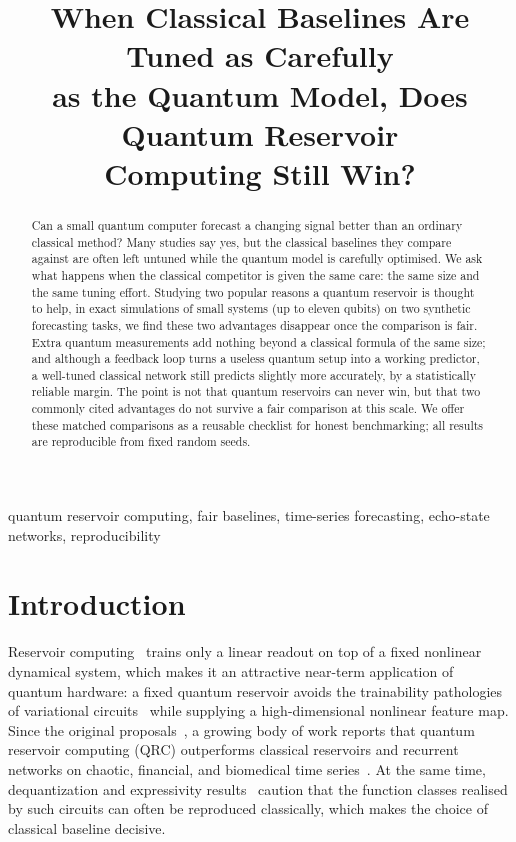 ﻿\documentclass[10pt,conference]{IEEEtran}
\begin{document}
\title{When Classical Baselines Are Tuned as Carefully\\
as the Quantum Model, Does Quantum Reservoir\\
Computing Still Win?}

\author{
}

\maketitle

\begin{abstract}
Can a small quantum computer forecast a changing signal better than an ordinary
classical method? Many studies say yes, but the classical baselines they compare
against are often left untuned while the quantum model is carefully optimised. We
ask what happens when the classical competitor is given the same care: the same
size and the same tuning effort. Studying two popular reasons a quantum reservoir
is thought to help, in exact simulations of small systems (up to eleven qubits)
on two synthetic forecasting tasks, we find these two advantages disappear once
the comparison is fair. Extra quantum
measurements add nothing beyond a classical formula of the same size; and although
a feedback loop turns a useless quantum setup into a working predictor, a
well-tuned classical network still predicts slightly more accurately, by a
statistically reliable margin. The point is not that quantum reservoirs can never
win, but that two commonly cited advantages do not survive a fair comparison at
this scale. We offer these matched comparisons as a reusable checklist for honest
benchmarking; all results are reproducible from fixed random seeds.
\end{abstract}

\begin{IEEEkeywords}
quantum reservoir computing, fair baselines, time-series forecasting, echo-state
networks, reproducibility
\end{IEEEkeywords}

\section{Introduction}

Reservoir computing~\cite{jaeger2001,maass2002} trains only a linear readout on
top of a fixed nonlinear dynamical system, which makes it an attractive
near-term application of quantum hardware: a fixed quantum reservoir avoids the
trainability pathologies of variational circuits~\cite{mcclean2018} while
supplying a high-dimensional nonlinear feature map. Since the original
proposals~\cite{fujii2017,nakajima2019}, a growing body of work reports that
quantum reservoir computing (QRC) outperforms classical reservoirs and recurrent
networks on chaotic, financial, and biomedical time
series~\cite{mujal2021,martinezpena2021}. At the same time, dequantization and
expressivity results~\cite{schuld2021,sweke2021} caution that the function
classes realised by such circuits can often be reproduced classically, which
makes the choice of classical baseline decisive.
\end{document}
